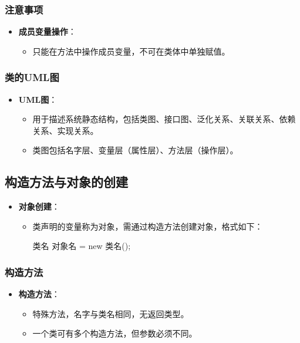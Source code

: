 \documentclass[a4paper, 10pt]{ctexart}
\begin{document}
\subsubsection{注意事项}
\begin{itemize}
  \item \textbf{成员变量操作}：
  \begin{itemize}
    \item 只能在方法中操作成员变量，不可在类体中单独赋值。
  \end{itemize}
\end{itemize}

\subsubsection{类的UML图}
\begin{itemize}
  \item \textbf{UML图}：
  \begin{itemize}
    \item 用于描述系统静态结构，包括类图、接口图、泛化关系、关联关系、依赖关系、实现关系。
    \item 类图包括名字层、变量层（属性层）、方法层（操作层）。
  \end{itemize}
\end{itemize}

\subsection{构造方法与对象的创建}
\begin{itemize}
  \item \textbf{对象创建}：
  \begin{itemize}
    \item 类声明的变量称为对象，需通过构造方法创建对象，格式如下：
    \begin{codeblock}
类名 对象名 = new 类名();
    \end{codeblock}
  \end{itemize}
\end{itemize}

\subsubsection{构造方法}
\begin{itemize}
  \item \textbf{构造方法}：
  \begin{itemize}
    \item 特殊方法，名字与类名相同，无返回类型。
    \item 一个类可有多个构造方法，但参数必须不同。
  \end{itemize}
\end{itemize}
\end{document}
